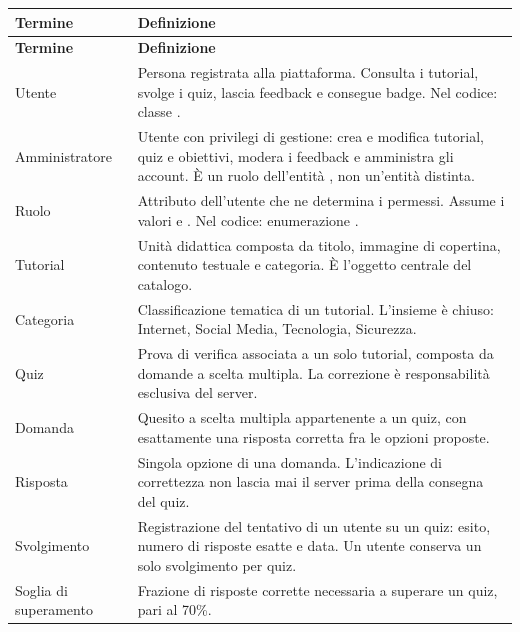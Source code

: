 \begin{longtable}{@{}L{3.2cm} L{11.5cm}@{}}
\toprule
\textbf{Termine} & \textbf{Definizione} \\
\midrule
\endfirsthead
\toprule
\textbf{Termine} & \textbf{Definizione} \\
\midrule
\endhead
\bottomrule
\endlastfoot

Utente &
Persona registrata alla piattaforma. Consulta i tutorial, svolge i quiz,
lascia feedback e consegue badge. Nel codice: classe . \\

Amministratore &
Utente con privilegi di gestione: crea e modifica tutorial, quiz e obiettivi,
modera i feedback e amministra gli account. È un ruolo dell'entità
, non un'entità distinta. \\

Ruolo &
Attributo dell'utente che ne determina i permessi. Assume i valori
 e . Nel codice: enumerazione . \\

Tutorial &
Unità didattica composta da titolo, immagine di copertina, contenuto testuale
e categoria. È l'oggetto centrale del catalogo. \\

Categoria &
Classificazione tematica di un tutorial. L'insieme è chiuso: Internet,
Social Media, Tecnologia, Sicurezza. \\

Quiz &
Prova di verifica associata a un solo tutorial, composta da domande a scelta
multipla. La correzione è responsabilità esclusiva del server. \\

Domanda &
Quesito a scelta multipla appartenente a un quiz, con esattamente una
risposta corretta fra le opzioni proposte. \\

Risposta &
Singola opzione di una domanda. L'indicazione di correttezza non lascia mai
il server prima della consegna del quiz. \\

Svolgimento &
Registrazione del tentativo di un utente su un quiz: esito, numero di
risposte esatte e data. Un utente conserva un solo svolgimento per quiz. \\

Soglia di superamento &
Frazione di risposte corrette necessaria a superare un quiz, pari al 70\%. \\


\end{longtable}
